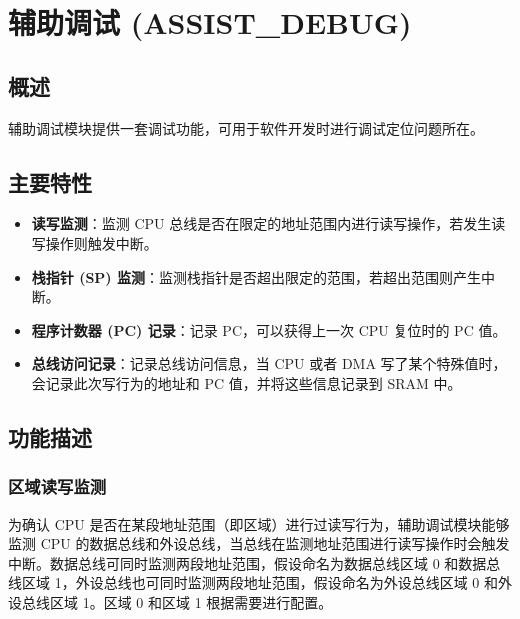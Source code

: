 \documentclass[main\_\_CN.tex]{subfiles}
\begin{document}

\ifglobal
\else
    {\let\clearpage\relax \listoftodos}
    \tableofcontents
\fi



\chapter{辅助调试 (ASSIST\_DEBUG)}
\label{mod:dbgassist}
\hypertarget{dbgassist}{}


\section{概述}

辅助调试模块提供一套调试功能，可用于软件开发时进行调试定位问题所在。

\section{主要特性}
\label{sec:dbgassist-features}

\begin{itemize}
    \item {\bfseries 读写监测}：监测 CPU 总线是否在限定的地址范围内进行读写操作，若发生读写操作则触发中断。
    \item {\bfseries 栈指针 (SP) 监测}：监测栈指针是否超出限定的范围，若超出范围则产生中断。
    \item {\bfseries 程序计数器 (PC) 记录}：记录 PC，可以获得上一次 CPU 复位时的 PC 值。
    \item {\bfseries 总线访问记录}：记录总线访问信息，当 CPU 或者 DMA 写了某个特殊值时，会记录此次写行为的地址和 PC 值，并将这些信息记录到 SRAM 中。
\end{itemize}


\section{功能描述}
\label{sec:dbgassist-func-descr}

\subsection{区域读写监测}
为确认 CPU 是否在某段地址范围（即区域）进行过读写行为，辅助调试模块能够监测 CPU 的数据总线和外设总线，当总线在监测地址范围进行读写操作时会触发中断。数据总线可同时监测两段地址范围，假设命名为数据总线区域 0 和数据总线区域 1，外设总线也可同时监测两段地址范围，假设命名为外设总线区域 0 和外设总线区域 1。区域 0 和区域 1 根据需要进行配置。
\end{document}
